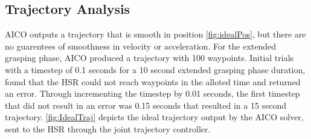 \documentclass[12pt]{article}
\begin{document}
        \subsection{Trajectory Analysis}
            AICO outputs a trajectory that is smooth in position \autoref{fig:idealPos}, but there are no guarentees of smoothness in velocity or acceleration. For the extended grasping phase, AICO produced a trajectory with 100 waypoints. Initial trials with a timestep of 0.1 seconds for a 10 second extended grasping phase duration, found that the HSR could not reach waypoints in the alloted time and returned an error. Through incrementing the timestep by 0.01 seconds, the first timestep that did not result in an error was 0.15 seconds that resulted in a 15 second trajectory.
            \autoref{fig:IdealTraj} depicts the ideal trajectory output by the AICO solver, sent to the HSR through the joint trajectory controller.
\end{document}
